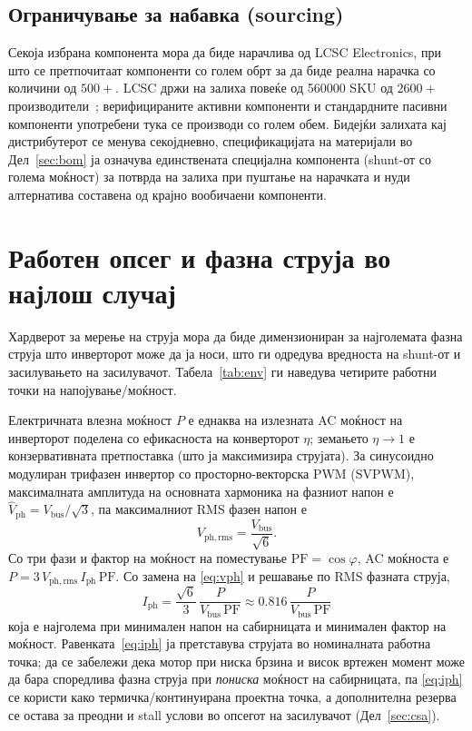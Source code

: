 \documentclass[journal,onecolumn,11pt]{IEEEtran}
\newcommand{\Vdcbus}{V_{\mathrm{bus}}}
\newcommand{\Iphrms}{I_{\mathrm{ph}}}
\begin{document}
\subsection{Ограничување за набавка (sourcing)}
Секоја избрана компонента мора да биде нарачлива од LCSC Electronics, при што се претпочитаат
компоненти со голем обрт за да биде реална нарачка со количини од \(500+\). LCSC држи на залиха
повеќе од \num{560000} SKU од \(2600+\) производители~\cite{lcschome}; верифицираните активни
компоненти и стандардните пасивни компоненти употребени тука се производи со голем обем. Бидејќи
залихата кај дистрибутерот се менува секојдневно, спецификацијата на материјали во
Дел~\ref{sec:bom} ја означува единствената специјална компонента (shunt-от со голема моќност) за
потврда на залиха при пуштање на нарачката и нуди алтернатива составена од крајно вообичаени
компоненти.

\section{Работен опсег и фазна струја во најлош случај}\label{sec:env}
Хардверот за мерење на струја мора да биде димензиониран за најголемата фазна струја што
инверторот може да ја носи, што ги одредува вредноста на shunt-от и засилувањето на засилувачот.
Табела~\ref{tab:env} ги наведува четирите работни точки на напојување/моќност.

Електричната влезна моќност \(P\) е еднаква на излезната AC моќност на инверторот поделена со
ефикасноста на конверторот \(\eta\); земањето \(\eta\!\to\!1\) е конзервативната претпоставка (што
ја максимизира струјата). За синусоидно модулиран трифазен инвертор со просторно-векторска PWM
(SVPWM), максималната амплитуда на основната хармоника на фазниот напон е
\(\hat V_{\mathrm{ph}}=\Vdcbus/\sqrt{3}\), па максималниот RMS фазен напон е
\begin{equation}
V_{\mathrm{ph,rms}}=\frac{\Vdcbus}{\sqrt{6}} .
\label{eq:vph}
\end{equation}
Со три фази и фактор на моќност на поместување \(\mathrm{PF}=\cos\varphi\), AC моќноста е
\(P = 3\,V_{\mathrm{ph,rms}}\,\Iphrms\,\mathrm{PF}\). Со замена на \eqref{eq:vph} и решавање по
RMS фазната струја,
\begin{equation}
\boxed{\;\Iphrms = \frac{\sqrt{6}}{3}\,\frac{P}{\Vdcbus\,\mathrm{PF}}
        \approx 0.816\,\frac{P}{\Vdcbus\,\mathrm{PF}}\;}
\label{eq:iph}
\end{equation}
која е најголема при минимален напон на сабирницата и минимален фактор на моќност.
Равенката~\eqref{eq:iph} ја претставува струјата во номиналната работна точка; да се забележи дека
мотор при ниска брзина и висок вртежен момент може да бара споредлива фазна струја при
\emph{пониска} моќност на сабирницата, па \eqref{eq:iph} се користи како термичка/континуирана
проектна точка, а дополнителна резерва се остава за преодни и stall услови во опсегот на
засилувачот (Дел~\ref{sec:csa}).
\end{document}

